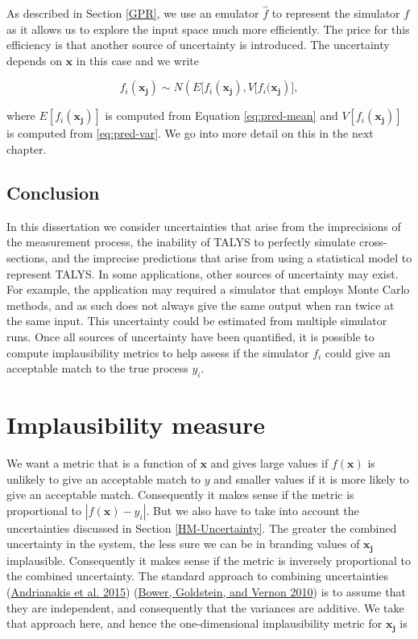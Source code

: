 \documentclass[
  12pt,
  a4paper,
  twoside]{book}
\begin{document}
As described in Section \ref{GPR}, we use an emulator \(\hat{f}\) to represent the simulator \(f\) as it allows us to explore the input space much more efficiently. The price for this efficiency is that another source of uncertainty is introduced. The uncertainty depends on \(\mathbf{x}\) in this case and we write

\begin{equation}
\label{eq:emulator-variance}
f_i(\mathbf{x_j}) \sim N\left( E[ f_i(\mathbf{x_j}), V[f_i(\mathbf{x_j}\right)],
\end{equation}

where \(E[f_i(\mathbf{x_j})]\) is computed from Equation \eqref{eq:pred-mean} and \(V[f_i(\mathbf{x_j})]\) is computed from \eqref{eq:pred-var}. We go into more detail on this in the next chapter.

\hypertarget{conclusion-1}{%
\subsection{Conclusion}\label{conclusion-1}}

In this dissertation we consider uncertainties that arise from the imprecisions of the measurement process, the inability of TALYS to perfectly simulate cross-sections, and the imprecise predictions that arise from using a statistical model to represent TALYS. In some applications, other sources of uncertainty may exist. For example, the application may required a simulator that employs Monte Carlo methods, and as such does not always give the same output when ran twice at the same input. This uncertainty could be estimated from multiple simulator runs. Once all sources of uncertainty have been quantified, it is possible to compute implausibility metrics to help assess if the simulator \(f_i\) could give an acceptable match to the true process \(y_i\).

\hypertarget{HM-Implausibility}{%
\section{Implausibility measure}\label{HM-Implausibility}}

We want a metric that is a function of \(\mathbf{x}\) and gives large values if \(f(\mathbf{x})\) is unlikely to give an acceptable match to \(y\) and smaller values if it is more likely to give an acceptable match. Consequently it makes sense if the metric is proportional to \(|f(\mathbf{x}) - y_i|\). But we also have to take into account the uncertainties discussed in Section \ref{HM-Uncertainty}. The greater the combined uncertainty in the system, the less sure we can be in branding values of \(\mathbf{x_j}\) implausible. Consequently it makes sense if the metric is inversely proportional to the combined uncertainty. The standard approach to combining uncertainties (\protect\hyperlink{ref-jeremy_histmatch}{Andrianakis et al. 2015}) (\protect\hyperlink{ref-bower2010galaxy}{Bower, Goldstein, and Vernon 2010}) is to assume that they are independent, and consequently that the variances are additive. We take that approach here, and hence the one-dimensional implausibility metric for \(\mathbf{x_j}\) is
\end{document}
